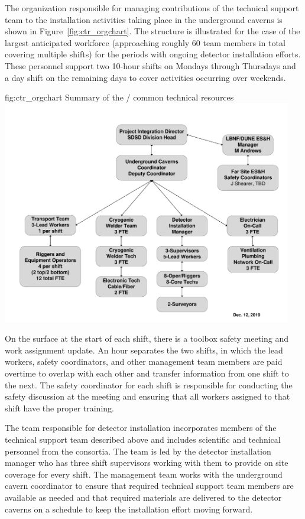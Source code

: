 The organization responsible for managing contributions of 
the technical support team to the installation 
activities taking place in the underground caverns is shown 
in Figure~\ref{fig:ctr_orgchart}.  The structure is illustrated
for the case of the largest anticipated workforce (approaching 
roughly 60 team members in total covering multiple shifts) 
for the periods with ongoing detector installation efforts.
These personnel support two 10-hour shifts on Mondays through 
Thursdays and a day shift on the remaining days to cover 
activities occurring over weekends. 
\begin{dunefigure}{fig:ctr_orgchart}
  {Summary of the / common technical resources}
  \includegraphics[width=0.95\textwidth]{graphics/org-common-technical-resources.pdf}
\end{dunefigure}

On the surface at the start of each shift, there is a toolbox safety
meeting and work assignment update. An hour separates the two shifts,
in which the lead workers, safety coordinators, and other management
team members are paid overtime to overlap with each other and
transfer information from one shift to the next. The safety
coordinator for each shift is responsible for conducting the safety
discussion at the meeting and ensuring that all workers assigned to
that shift have the proper training.

The team responsible for detector installation incorporates 
members of the technical support team described above 
and includes scientific and technical personnel from 
the  consortia.  The team is led by the detector
installation manager who has three shift supervisors working 
with them to provide on site coverage for every shift.
The management team works with the underground cavern
coordinator to ensure that required technical support team 
members are available as needed and that required materials 
are delivered to the detector caverns on a schedule to keep
the installation effort moving forward.         

